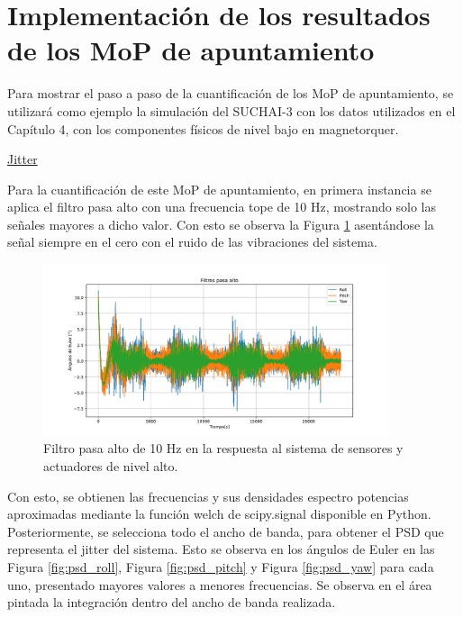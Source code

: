\section{Implementación de los resultados de los MoP de apuntamiento}

\label{ap:Z8}


Para mostrar el paso a paso de la cuantificación de los MoP de apuntamiento, se utilizará como ejemplo la simulación del SUCHAI-3 con los datos utilizados en el Capítulo 4, con los componentes físicos de nivel bajo en magnetorquer.

\underline{Jitter}

Para la cuantificación de este MoP de apuntamiento, en primera instancia se aplica el filtro pasa alto con una frecuencia tope de 10 Hz, mostrando solo las señales mayores a dicho valor. Con esto se observa la Figura \ref{fig:RPY_highpass} asentándose la señal siempre en el cero con el ruido de las vibraciones del sistema.

\begin{figure}[h!]
	\centering    
	\includegraphics[width=0.9\textwidth]{RPY_highpass.pdf}
	\caption{Filtro pasa alto de 10 Hz en la respuesta al sistema de sensores y actuadores de nivel alto.}
	\label{fig:RPY_highpass}
\end{figure}	


Con esto, se obtienen las frecuencias y sus densidades espectro potencias aproximadas mediante la función welch de scipy.signal disponible en Python. Posteriormente, se selecciona todo el ancho de banda, para obtener el PSD que representa el jitter del sistema. Esto se observa en los ángulos de Euler en las Figura \ref{fig:psd_roll}, Figura \ref{fig:psd_pitch} y Figura \ref{fig:psd_yaw} para cada uno, presentado mayores valores a menores frecuencias. Se observa en el área pintada la integración dentro del ancho de banda realizada.

